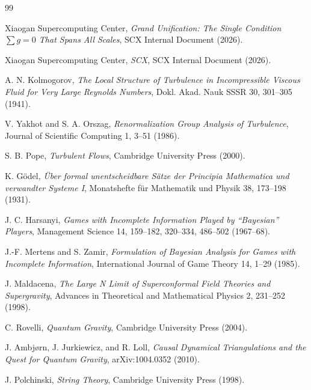 \documentclass[12pt,a4paper]{article}
\theoremstyle{remark}
\begin{document}
\newpage


\begin{thebibliography}{99}

Xiaogan Supercomputing Center, \textit{Grand Unification: The Single Condition $\sum g = 0$ That Spans All Scales}, SCX Internal Document (2026).

Xiaogan Supercomputing Center, \textit{SCX}, SCX Internal Document (2026).

A. N. Kolmogorov, \textit{The Local Structure of Turbulence in Incompressible Viscous Fluid for Very Large Reynolds Numbers}, Dokl. Akad. Nauk SSSR 30, 301--305 (1941).

V. Yakhot and S. A. Orszag, \textit{Renormalization Group Analysis of Turbulence}, Journal of Scientific Computing 1, 3--51 (1986).

S. B. Pope, \textit{Turbulent Flows}, Cambridge University Press (2000).

K. Gödel, \textit{Über formal unentscheidbare Sätze der Principia Mathematica und verwandter Systeme I}, Monatshefte für Mathematik und Physik 38, 173--198 (1931).

J. C. Harsanyi, \textit{Games with Incomplete Information Played by ``Bayesian'' Players}, Management Science 14, 159--182, 320--334, 486--502 (1967--68).

J.-F. Mertens and S. Zamir, \textit{Formulation of Bayesian Analysis for Games with Incomplete Information}, International Journal of Game Theory 14, 1--29 (1985).

J. Maldacena, \textit{The Large N Limit of Superconformal Field Theories and Supergravity}, Advances in Theoretical and Mathematical Physics 2, 231--252 (1998).

C. Rovelli, \textit{Quantum Gravity}, Cambridge University Press (2004).

J. Ambjørn, J. Jurkiewicz, and R. Loll, \textit{Causal Dynamical Triangulations and the Quest for Quantum Gravity}, arXiv:1004.0352 (2010).

J. Polchinski, \textit{String Theory}, Cambridge University Press (1998).


\end{thebibliography}
\end{document}
